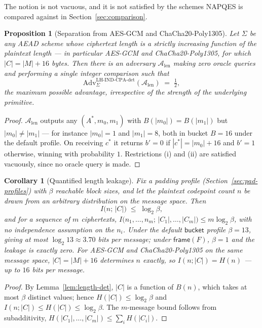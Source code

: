 \documentclass[11pt,a4paper]{article}
\newtheorem{proposition}[theorem]{Proposition}
\newtheorem{corollary}[theorem]{Corollary}
\begin{document}
The notion is not vacuous, and it is not satisfied by the schemes NAPQES is
compared against in Section~\ref{sec:comparison}.

\begin{proposition}[Separation from AES-GCM and ChaCha20-Poly1305]
\label{prop:lh-separation}
Let $\Sigma$ be any AEAD scheme whose ciphertext length is a strictly
increasing function of the plaintext length — in particular AES-GCM and
ChaCha20-Poly1305, for which $|C|=|M|+16$ bytes. Then there is an adversary
$\mathcal{A}_{\mathrm{len}}$ making \emph{zero} oracle queries and
performing a single integer comparison such that
\[
  \mathrm{Adv}^{\mathrm{LH\text{-}IND\text{-}CPA\text{-}det}}_{\Sigma}(\mathcal{A}_{\mathrm{len}}) \;=\; \tfrac12,
\]
the maximum possible advantage, irrespective of the strength of the
underlying primitive.
\end{proposition}

\begin{proof}
$\mathcal{A}_{\mathrm{len}}$ outputs any $(A^*,m_0,m_1)$ with
$B(|m_0|)=B(|m_1|)$ but $|m_0|\neq|m_1|$ — for instance $|m_0|=1$ and
$|m_1|=8$, both in bucket $B=16$ under the default profile. On receiving
$c^*$ it returns $b'=0$ if $|c^*|=|m_0|+16$ and $b'=1$ otherwise, winning
with probability $1$. Restrictions (i) and (ii) are satisfied vacuously,
since no oracle query is made.
\end{proof}

\begin{corollary}[Quantified length leakage]\label{cor:length-leak}
Fix a padding profile (Section~\ref{sec:pad-profiles}) with $\beta$
reachable block sizes, and let the plaintext codepoint count $n$ be drawn
from an arbitrary distribution on the message space. Then
\[
  I\bigl(n;\,|C|\bigr) \;\le\; \log_2\beta,
\]
and for a sequence of $m$ ciphertexts,
$I\bigl(n_1,\ldots,n_m;\,|C_1|,\ldots,|C_m|\bigr)\le m\log_2\beta$, with no
independence assumption on the $n_i$. Under the default $\mathsf{bucket}$
profile $\beta=13$, giving at most $\log_2 13\approx3.70$ bits per message;
under $\mathsf{frame}(F)$, $\beta=1$ and the leakage is exactly zero. For
AES-GCM and ChaCha20-Poly1305 on the same message space, $|C|=|M|+16$
determines $n$ exactly, so $I(n;|C|)=H(n)$ — up to $16$ bits per message.
\end{corollary}

\begin{proof}
By Lemma~\ref{lem:length-det}, $|C|$ is a function of $B(n)$, which takes at
most $\beta$ distinct values; hence $H(|C|)\le\log_2\beta$ and
$I(n;|C|)\le H(|C|)\le\log_2\beta$. The $m$-message bound follows from
subadditivity, $H(|C_1|,\ldots,|C_m|)\le\sum_i H(|C_i|)$.
\end{proof}
\end{document}
